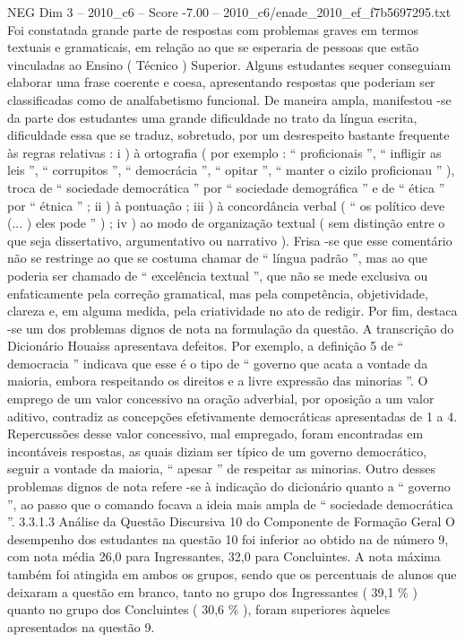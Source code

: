 \begin{textsample}{NEG Dim 3 – 2010\_c6 – Score -7.00 – 2010\_c6/enade\_2010\_ef\_f7b5697295.txt}
Foi constatada grande parte de respostas com problemas graves em termos textuais e gramaticais, em relação ao que se esperaria de pessoas que estão vinculadas ao Ensino ( Técnico ) Superior.
Alguns estudantes sequer conseguiam elaborar uma frase coerente e coesa, apresentando respostas que poderiam ser classificadas como de analfabetismo funcional.
De maneira ampla, manifestou -se da parte dos estudantes uma grande dificuldade no trato da língua escrita, dificuldade essa que se traduz, sobretudo, por um desrespeito bastante frequente às regras relativas : i ) à ortografia ( por exemplo : “ proficionais ”, “ infligir as leis ”, “ corrupitos ”, “ democrácia ”, “ opitar ”, “ manter o cizilo proficionau ” ), troca de “ sociedade democrática ” por “ sociedade demográfica ” e de “ ética ” por “ étnica ” ; ii ) à pontuação ; iii ) à concordância verbal ( “ os político deve (... ) eles pode ” ) ; iv ) ao modo de organização textual ( sem distinção entre o que seja dissertativo, argumentativo ou narrativo ).
Frisa -se que esse comentário não se restringe ao que se costuma chamar de “ língua padrão ”, mas ao que poderia ser chamado de “ excelência textual ”, que não se mede exclusiva ou enfaticamente pela correção gramatical, mas pela competência, objetividade, clareza e, em alguma medida, pela criatividade no ato de redigir.
Por fim, destaca -se um dos problemas dignos de nota na formulação da questão.
A transcrição do Dicionário Houaiss apresentava defeitos.
Por exemplo, a definição 5 de “ democracia ” indicava que esse é o tipo de “ governo que acata a vontade da maioria, embora respeitando os direitos e a livre expressão das minorias ”.
O emprego de um valor concessivo na oração adverbial, por oposição a um valor aditivo, contradiz as concepções efetivamente democráticas apresentadas de 1 a 4.
Repercussões desse valor concessivo, mal empregado, foram encontradas em incontáveis respostas, as quais diziam ser típico de um governo democrático, seguir a vontade da maioria, “ apesar ” de respeitar as minorias.
Outro desses problemas dignos de nota refere -se à indicação do dicionário quanto a “ governo ”, ao passo que o comando focava a ideia mais ampla de “ sociedade democrática ”. 3.3.1.3 Análise da Questão Discursiva 10 do Componente de Formação Geral O desempenho dos estudantes na questão 10 foi inferior ao obtido na de número 9, com nota média 26,0 para Ingressantes, 32,0 para Concluintes.
A nota máxima também foi atingida em ambos os grupos, sendo que os percentuais de alunos que deixaram a questão em branco, tanto no grupo dos Ingressantes ( 39,1 \% ) quanto no grupo dos Concluintes ( 30,6 \% ), foram superiores àqueles apresentados na questão 9.

\end{textsample}
